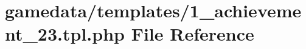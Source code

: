 \hypertarget{1__achievement__23_8tpl_8php}{\section{gamedata/templates/1\+\_\+achievement\+\_\+23.tpl.\+php File Reference}
\label{1__achievement__23_8tpl_8php}
}
